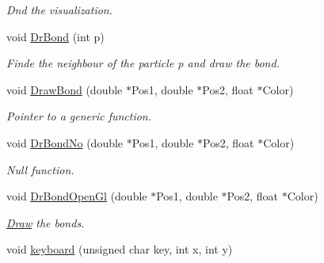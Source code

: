 \begin{DoxyCompactItemize}
\begin{DoxyCompactList}\small\item\em Dnd the visualization. \end{DoxyCompactList}\item 
void \hyperlink{classElPoly_abe58ec64ad127f7a85a62feefbfac4b6}{Dr\+Bond} (int p)\hypertarget{classElPoly_abe58ec64ad127f7a85a62feefbfac4b6}{}\label{classElPoly_abe58ec64ad127f7a85a62feefbfac4b6}

\begin{DoxyCompactList}\small\item\em Finde the neighbour of the particle p and draw the bond. \end{DoxyCompactList}\item 
void \hyperlink{classElPoly_ab8aa99cf5632c9a9183e7881d25b1cf7}{Draw\+Bond} (double $\ast$Pos1, double $\ast$Pos2, float $\ast$Color)\hypertarget{classElPoly_ab8aa99cf5632c9a9183e7881d25b1cf7}{}\label{classElPoly_ab8aa99cf5632c9a9183e7881d25b1cf7}

\begin{DoxyCompactList}\small\item\em Pointer to a generic function. \end{DoxyCompactList}\item 
void \hyperlink{classElPoly_a6a54cbe2df971f838e96bef0ffb100d4}{Dr\+Bond\+No} (double $\ast$Pos1, double $\ast$Pos2, float $\ast$Color)\hypertarget{classElPoly_a6a54cbe2df971f838e96bef0ffb100d4}{}\label{classElPoly_a6a54cbe2df971f838e96bef0ffb100d4}

\begin{DoxyCompactList}\small\item\em Null function. \end{DoxyCompactList}\item 
void \hyperlink{classElPoly_a008a495b2076738e496001e0ba8a8ea4}{Dr\+Bond\+Open\+Gl} (double $\ast$Pos1, double $\ast$Pos2, float $\ast$Color)\hypertarget{classElPoly_a008a495b2076738e496001e0ba8a8ea4}{}\label{classElPoly_a008a495b2076738e496001e0ba8a8ea4}

\begin{DoxyCompactList}\small\item\em \hyperlink{classDraw}{Draw} the bonds. \end{DoxyCompactList}\item 
void \hyperlink{classElPoly_aef7ba2f69afb2d954545f64c7fe24b14}{keyboard} (unsigned char key, int x, int y)\hypertarget{classElPoly_aef7ba2f69afb2d954545f64c7fe24b14}{}\label{classElPoly_aef7ba2f69afb2d954545f64c7fe24b14}


\end{DoxyCompactItemize}
